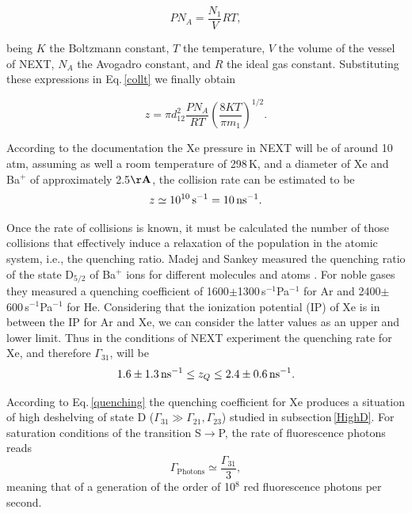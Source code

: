 \begin{equation}
PN_{A}=\frac{N_1}{V}RT,
\end{equation}

being $K$ the Boltzmann constant, $T$ the temperature, $V$ the volume of the vessel of NEXT, $N_A$ the Avogadro constant, and $R$ the ideal gas constant. Substituting these expressions in Eq.\,\ref{collt} we finally obtain

\begin{equation}
\label{collt_2}
z=\pi d_{12}^2  \frac{PN_A}{R T}\left(\frac{8KT}{\pi m_1}\right)^{1/2}.
\end{equation}

According to the documentation the Xe pressure in NEXT will be of around 10\,atm, assuming as well a room temperature of 298\,K, and a diameter of Xe and Ba$^+$ of approximately 2.5$\mathbf{\AA}$, the collision rate can be estimated to be 
\begin{equation}
\label{coll_rate}
z\simeq10^{10}\,\text{s}^{-1}=10\,\text{ns$^{-1}$}.
\end{equation}
 
 Once the rate of collisions is known, it must be calculated the number of those collisions that effectively induce a relaxation of the population in the atomic system, i.e., the quenching ratio. Madej and Sankey measured the quenching ratio of the state D$_{5/2}$ of Ba$^+$ ions for different molecules and atoms \cite{Sankey90}. For noble gases they measured a quenching coefficient of 1600$\pm$1300\,s$^{-1}$Pa$^{-1}$ for Ar and 2400$\pm$600\,s$^{-1}$Pa$^{-1}$ for He. Considering that the ionization potential (IP) of Xe is in between the IP for Ar and Xe, we can consider the latter values as an upper and lower limit. Thus in the conditions of NEXT experiment the quenching rate for Xe, and therefore $\Gamma_{31}$, will be
\begin{equation}
\label{quenching}
1.6\pm1.3\,\text{ns$^{-1}$} \leq z_Q \leq 2.4\pm0.6\,\text{ns$^{-1}$}. 
\end{equation}

According to Eq.\,\ref{quenching} the quenching coefficient for Xe produces a situation of high deshelving of state D ($\Gamma_{31}\gg\Gamma_{21}, \Gamma_{23}$) studied in subsection\,\ref{HighD}. For saturation conditions of the transition S$\rightarrow$P, the rate of fluorescence photons reads
\begin{equation}
\Gamma_{\text{Photons}}\simeq\frac{\Gamma_{31}}{3},
\end{equation}
meaning that of a generation of the order of 10$^8$ red fluorescence photons per second.

